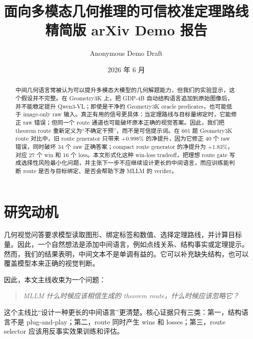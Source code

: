 \documentclass[UTF8,11pt]{ctexart}
\title{面向多模态几何推理的可信校准定理路线\\
\large 精简版 arXiv Demo 报告}
\author{Anonymous Demo Draft}
\date{2026 年 6 月}
\begin{document}
\maketitle

\begin{abstract}
中间几何语言常被认为可以提升多模态大模型的几何解题能力，但我们的实验显示，这个假设并不完整。在 Geometry3K 上，把 GDP-4B 自动结构语言追加到原始图像后，并不能稳定提升 Qwen3-VL；即使是干净的 Geometry3K oracle predicates，也可能低于 image-only raw 输入。真正有用的信号更具体：当定理路线与目标量绑定时，它能修正 raw 错误；但同一个 route 通道也可能破坏原本正确的视觉答案。因此，我们把 theorem route 重新定义为“不确定干预”，而不是可信提示词。在 601 题 Geometry3K route 对比中，旧 route generator 只带来 \(+0.998\%\) 的净提升，因为它修正 40 个 raw 错误，同时破坏 34 个 raw 正确答案；compact route generator 的净提升为 \(+1.83\%\)，对应 27 个 win 和 16 个 loss。本文形式化这种 win-loss tradeoff，把理想 route gate 写成选择性风险最小化问题，并主张下一步不应继续设计更长的中间语言，而应训练能判断 route 是否与目标绑定、是否会帮助下游 MLLM 的 verifier。
\end{abstract}

\section{研究动机}
几何视觉问答要求模型读取图形、绑定标签和数值、选择定理路线，并计算目标量。因此，一个自然想法是添加中间语言，例如点线关系、结构事实或定理提示。然而，我们的结果表明，中间文本不是单调有益的。它可以补充缺失结构，也可以覆盖模型本来正确的视觉判断。

因此，本文主线收束为一个问题：
\begin{quote}
\emph{MLLM 什么时候应该相信生成的 theorem route，什么时候应该忽略它？}
\end{quote}
这个主线比“设计一种更长的中间语言”更清楚。核心证据只有三类：第一，结构语言不是 plug-and-play；第二，route 同时产生 wins 和 losses；第三，route selector 应该用反事实效果训练和评估。
\end{document}

